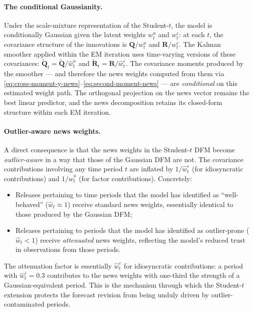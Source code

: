 \documentclass[11pt, a4paper, oneside]{article}
\begin{document}
\paragraph{The conditional Gaussianity.}
Under the scale-mixture representation of the Student-$t$, the model
is conditionally Gaussian given the latent weights $w^u_t$ and
$w^\varepsilon_t$: at each $t$, the covariance structure of the
innovations is $\mathbf{Q}/w^u_t$ and $\mathbf{R}/w^\varepsilon_t$.
The Kalman smoother applied within the EM iteration uses
time-varying versions of these covariances:
$\tilde{\mathbf{Q}}_t = \tilde{\mathbf{Q}}/\hat{w}^u_t$ and
$\tilde{\mathbf{R}}_t = \mathbf{R}/\hat{w}^\varepsilon_t$. The
covariance moments produced by the smoother — and therefore the
news weights computed from them via
\eqref{eq:cross-moment-y-news}--\eqref{eq:second-moment-news} — are
\emph{conditional} on this estimated weight path. The orthogonal
projection on the news vector remains the best linear predictor,
and the news decomposition retains its closed-form structure within
each EM iteration.

\paragraph{Outlier-aware news weights.}
A direct consequence is that the news weights in the Student-$t$ DFM
become \emph{outlier-aware} in a way that those of the Gaussian DFM
are not. The covariance contributions involving any time period $t$
are inflated by $1/\hat{w}^\varepsilon_t$ (for idiosyncratic
contributions) and $1/\hat{w}^u_t$ (for factor contributions).
Concretely:
\begin{itemize}[leftmargin=1.5em, itemsep=3pt]
    \item Releases pertaining to time periods that the model has
          identified as ``well-behaved'' ($\hat{w}_t \approx 1$)
          receive standard news weights, essentially identical to
          those produced by the Gaussian DFM;
    \item Releases pertaining to periods that the model has
          identified as outlier-prone ($\hat{w}_t < 1$) receive
          \emph{attenuated} news weights, reflecting the model's
          reduced trust in observations from those periods.
\end{itemize}
The attenuation factor is essentially $\hat{w}^\varepsilon_t$ for
idiosyncratic contributions: a period with $\hat{w}^\varepsilon_t = 0.3$
contributes to the news weights with one-third the strength of a
Gaussian-equivalent period. This is the mechanism through which the
Student-$t$ extension protects the forecast revision from being
unduly driven by outlier-contaminated periods.
\end{document}

